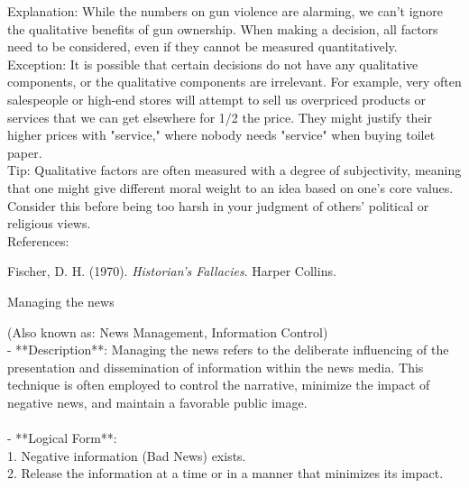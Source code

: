 \documentclass[a4paper,12pt,single,pdftex]{scrartcl}
\begin{document}
{    
      Explanation: While the numbers on gun violence are alarming, we can't ignore the qualitative benefits of gun ownership. When making a decision, all factors need to be considered, even if they cannot be measured quantitatively.
    \\

    
      Exception: It is possible that certain decisions do not have any qualitative components, or the qualitative components are irrelevant. For example, very often salespeople or high-end stores will attempt to sell us overpriced products or services that we can get elsewhere for 1/2 the price. They might justify their higher prices with "service," where nobody needs "service" when buying toilet paper.
    \\

    
      Tip: Qualitative factors are often measured with a degree of subjectivity, meaning that one might give different moral weight to an idea based on one's core values. Consider this before being too harsh in your judgment of others' political or religious views.
    \\

    References:

    
      
        Fischer, D. H. (1970). {\it Historian’s Fallacies}. Harper Collins.
      
    
  }


Managing the news
    
      (Also known as: News Management, Information Control)
    \\

  
    
      - **Description**: Managing the news refers to the deliberate influencing of the presentation and dissemination of information within the news media. This technique is often employed to control the narrative, minimize the impact of negative news, and maintain a favorable public image.
    \\

    
      
    \\

    
      - **Logical Form**:
    \\

    
        1. Negative information (Bad News) exists.
    \\

    
        2. Release the information at a time or in a manner that minimizes its impact.
    \\
\end{document}
